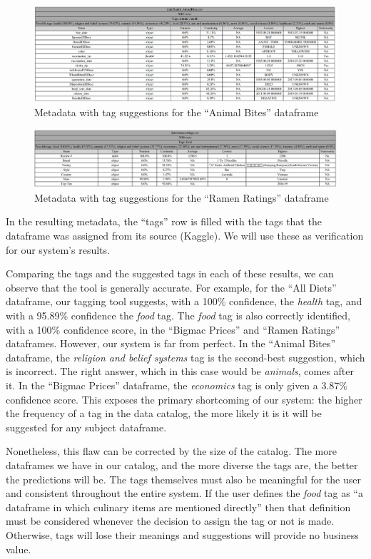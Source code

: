 \begin{figure}[h]
    \centering
    \includegraphics[width=12cm]{figures/tag_suggestions/health_animal_bites_tags}
    \caption{Metadata with tag suggestions for the ``Animal Bites'' dataframe}
    \label{fig:animal_bites_tags}
\end{figure}

\begin{figure}[h]
    \centering
    \includegraphics[width=12cm]{figures/tag_suggestions/ramen_ratings_tags}
    \caption{Metadata with tag suggestions for the ``Ramen Ratings'' dataframe}
    \label{fig:ramen_ratings_tags}
\end{figure}

In the resulting metadata, the ``tags'' row is filled with the tags that the dataframe was assigned from its source (Kaggle).
We will use these as verification for our system's results.

Comparing the tags and the suggested tags in each of these results, we can observe that the tool is generally accurate.
For example, for the ``All Diets'' dataframe, our tagging tool suggests, with a 100\% confidence, the \textit{health} tag,
and with a 95.89\% confidence the \textit{food} tag.
The \textit{food} tag is also correctly identified, with a 100\% confidence score, in the ``Bigmac Prices'' and ``Ramen Ratings''
dataframes.
However, our system is far from perfect.
In the ``Animal Bites'' dataframe, the \textit{religion and belief systems} tag is the second-best suggestion, which is incorrect.
The right answer, which in this case would be \textit{animals}, comes after it.
In the ``Bigmac Prices'' dataframe, the \textit{economics} tag is only given a 3.87\% confidence score.
This exposes the primary shortcoming of our system: the higher the frequency of a tag in the data catalog, the more likely
it is it will be suggested for any subject dataframe.

Nonetheless, this flaw can be corrected by the size of the catalog.
The more dataframes we have in our catalog, and the more diverse the tags are, the better the predictions will be.
The tags themselves must also be meaningful for the user and consistent throughout the entire system.
If the user defines the \textit{food} tag as ``a dataframe in which culinary items are mentioned directly'' then that definition
must be considered whenever the decision to assign the tag or not is made.
Otherwise, tags will lose their meanings and suggestions will provide no business value.